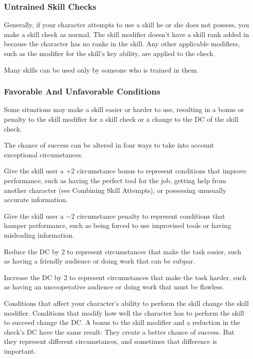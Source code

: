 \subsubsection{Untrained Skill Checks}
Generally, if your character attempts to use a skill he or she does not possess, you make a skill check as normal. The skill modifier doesn't have a skill rank added in because the character has no ranks in the skill. Any other applicable modifiers, such as the modifier for the skill's key ability, are applied to the check.

Many skills can be used only by someone who is trained in them.

\subsubsection{Favorable And Unfavorable Conditions}
Some situations may make a skill easier or harder to use, resulting in a bonus or penalty to the skill modifier for a skill check or a change to the DC of the skill check.

The chance of success can be altered in four ways to take into account exceptional circumstances.
\begin{enumerate*}
\item Give the skill user a +2 circumstance bonus to represent conditions that improve performance, such as having the perfect tool for the job, getting help from another character (see Combining Skill Attempts), or possessing unusually accurate information.
\item Give the skill user a $-2$ circumstance penalty to represent conditions that hamper performance, such as being forced to use improvised tools or having misleading information.
\item Reduce the DC by 2 to represent circumstances that make the task easier, such as having a friendly audience or doing work that can be subpar.
\item Increase the DC by 2 to represent circumstances that make the task harder, such as having an uncooperative audience or doing work that must be flawless.
\end{enumerate*}
Conditions that affect your character's ability to perform the skill change the skill modifier. Conditions that modify how well the character has to perform the skill to succeed change the DC. A bonus to the skill modifier and a reduction in the check's DC have the same result: They create a better chance of success. But they represent different circumstances, and sometimes that difference is important.

